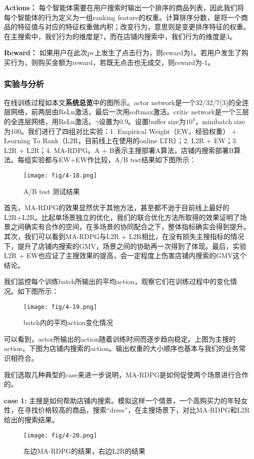 \textbf{Actions：} 每个智能体需要在用户搜索时输出一个排序的商品列表，因此我们将每个智能体的行为定义为一组ranking feature的权重。计算排序分数，是将一个商品的特征值与对应的特征权重做内积；改变行为，意思则是变更排序特征的权重。在主搜索中，我们行为的维度是7，而在店铺内搜索中，我们行为的维度是3。

\textbf{Reward：} 如果用户在此次pv上发生了点击行为，则reward为1。若用户发生了购买行为，则购买金额为reward，若既无点击也无成交，则reward为-1。

\subsubsection{实验与分析}
在线训练过程如本文\textbf{系统总览}中的图所示。actor network是一个32/32/7(3)的全连层网络，前两层由ReLu激活，最后一次用softmax激活。critic network是一个三层的全连层网络，用ReLu激活。$\gamma$设置为0.9。设置buffer size为$10^4$，minibatch size为100。我们进行了四组对比实验：1. Empirical Weight（EW，经验权重） + Learning To Rank（L2R，目前线上在使用的online LTR）；2. L2R + EW；3. L2R + L2R；4. MA-RDPG。A + B表示主搜部署A算法，店铺内搜索部署B算法。每组实验都与EW+EW作比较，A/B test结果如下图所示：
\begin{figure}[!h]
\centering
\texttt{[image: fig/4-18.png]}
\caption{ A/B test 测试结果}
\end{figure}

首先，MA-RDPG的效果显然优于其他方法，甚至都不逊于目前线上最好的L2R+L2R。比起单场景独立的优化，我们的联合优化方法所取得的效果证明了场景之间确实有合作的空间，在多场景的协同配合之下，整体指标确实会得到提升。其次，我们可以看到MA-RDPG与L2R + L2R相比，在没有损失主搜指标的情况下，提升了店铺内搜索的GMV，场景之间的协助再一次得到了体现。最后，实验L2R + EW也应证了主搜效果的提高，会一定程度上伤害店铺内搜索的GMV这个结论。

我们监控每个训练batch所输出的平均action，观察它们在训练过程中的变化情况。如下图所示：
\begin{figure}[!h]
\centering
\texttt{[image: fig/4-19.png]}
\caption{ batch内的平均action变化情况}
\end{figure}

可以看到，actor所输出的action随着训练时间而逐步趋向稳定。上图为主搜的action，下图为店铺内搜索的action。输出权重的大小顺序也基本与我们的业务常识相符合。

我们选取几种典型的case来进一步说明，MA-RDPG是如何促使两个场景进行合作的。

\textbf{case 1:} 主搜是如何帮助店铺内搜索。模拟这样一个情景，一个高购买力的年轻女性，在寻找价格较高的商品，搜索“dress”，在主搜场景下，对比MA-RDPG和L2R给出的搜索结果。
\begin{figure}[!h]
\centering
\texttt{[image: fig/4-20.png]}
\caption{ 左边MA-RDPG的结果，右边L2R的结果}
\end{figure}

